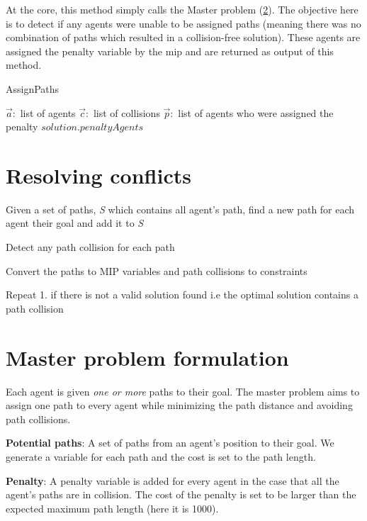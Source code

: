 \documentclass[a4paper,11pt]{article}
\let\oldReturn\Return
\renewcommand{\Return}{\State\oldReturn}
\begin{document}
At the core, this method simply calls the Master problem (\ref{sec:mip}). The objective here is to detect if any agents were unable to be assigned paths (meaning there was no combination of paths which resulted in a collision-free solution). These agents are assigned the penalty variable by the mip and are returned as output of this method.

\begin{algorithm}
	\caption{AssignPaths}\label{alg_AssignPaths}
	\begin{algorithmic}[1]
		\Require $\vec{a}:$ list of agents $\vec{c}:$ list of collisions
		\Ensure $\vec{p}:$ list of agents who were assigned the penalty
		\EndFor 
		\Return $solution.penaltyAgents$
	\end{algorithmic}
\end{algorithm}

\section{Resolving conflicts}
\begin{compactenum}
	\item Given a set of paths, \textit{S} which contains all agent's path, find a new path for each agent their goal and add it to \textit{S}
	\item Detect any path collision for each path
	\item Convert the paths to MIP variables and path collisions to constraints
	\item Repeat 1. if there is not a valid solution found i.e the optimal solution contains a path collision
\end{compactenum}

\section{Master problem formulation} \label{sec:mip}
Each agent is given \textit{one or more} paths to their goal. The master problem aims to assign one path to every agent while minimizing the path distance and avoiding path collisions. 

\begin{compactitem}
	\item \textbf{Potential paths}: A set of paths from an agent's position to their goal. We generate a variable for each path and the cost is set to the path length.
	\item \textbf{Penalty}: A penalty variable is added for every agent in the case that all the agent's paths are in collision. The cost of the penalty is set to be larger than the expected maximum path length (here it is 1000).
\end{compactitem}
\end{document}
